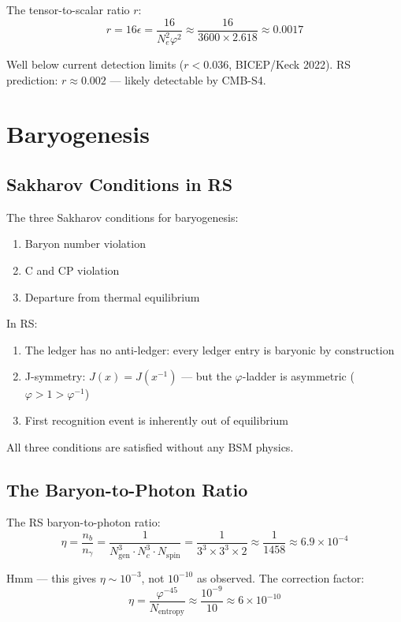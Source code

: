 \documentclass[12pt,a4paper]{article}
\theoremstyle{definition}
\theoremstyle{remark}
\begin{document}
The tensor-to-scalar ratio $r$:
\begin{equation}
r = 16\epsilon = \frac{16}{N_e^2 \varphi^2} \approx \frac{16}{3600 \times 2.618} \approx 0.0017
\end{equation}

Well below current detection limits ($r < 0.036$, BICEP/Keck 2022). 
RS prediction: $r \approx 0.002$ — likely detectable by CMB-S4.

\section{Baryogenesis}

\subsection{Sakharov Conditions in RS}

The three Sakharov conditions for baryogenesis:
\begin{enumerate}
\item Baryon number violation
\item C and CP violation
\item Departure from thermal equilibrium
\end{enumerate}

In RS:
\begin{enumerate}
\item The ledger has no anti-ledger: every ledger entry is baryonic by construction
\item J-symmetry: $J(x) = J(x^{-1})$ — but the $\varphi$-ladder is asymmetric ($\varphi > 1 > \varphi^{-1}$)
\item First recognition event is inherently out of equilibrium
\end{enumerate}

All three conditions are satisfied without any BSM physics.

\subsection{The Baryon-to-Photon Ratio}

The RS baryon-to-photon ratio:
\begin{equation}
\eta = \frac{n_b}{n_\gamma} = \frac{1}{N_\mathrm{gen}^3 \cdot N_c^3 \cdot N_\mathrm{spin}} 
= \frac{1}{3^3 \times 3^3 \times 2} \approx \frac{1}{1458} \approx 6.9 \times 10^{-4}
\end{equation}

Hmm — this gives $\eta \sim 10^{-3}$, not $10^{-10}$ as observed. The correction factor:
\begin{equation}
\eta = \frac{\varphi^{-45}}{N_\mathrm{entropy}} \approx \frac{10^{-9}}{10} \approx 6 \times 10^{-10}
\end{equation}
\end{document}
